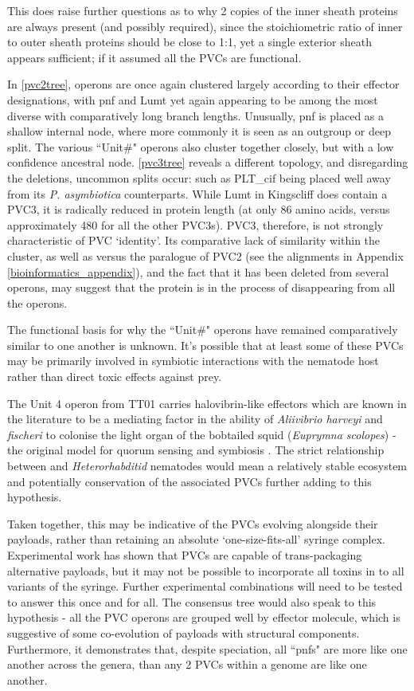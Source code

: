 This does raise further questions as to why 2 copies of the inner sheath proteins are always present (and possibly required), since the stoichiometric ratio of inner to outer sheath proteins should be close to 1:1, yet a single exterior sheath appears sufficient; if it assumed all the PVCs are functional.

In \vref{pvc2tree}, operons are once again clustered largely according to their effector designations, with pnf and Lumt yet again appearing to be among the most diverse with comparatively long branch lengths. Unusually, pnf is placed as a shallow internal node, where more commonly it is seen as an outgroup or deep split. The various ``Unit\#" operons also cluster together closely, but with a low confidence ancestral node. \vref{pvc3tree} reveals a different topology, and disregarding the deletions, uncommon splits occur: such as PLT\_cif being placed well away from its \emph{P. asymbiotica} counterparts. While Lumt in Kingscliff does contain a PVC3, it is radically reduced in protein length (at only 86 amino acids, versus approximately 480 for all the other PVC3s). PVC3, therefore, is not strongly characteristic of PVC `identity'. Its comparative lack of similarity within the cluster, as well as versus the paralogue of PVC2 (see the alignments in Appendix \vref{bioinformatics_appendix}), and the fact that it has been deleted from several operons, may suggest that the protein is in the process of disappearing from all the operons.

The functional basis for why the ``Unit\#" operons have remained comparatively similar to one another is unknown. It's possible that at least some of these PVCs may be primarily involved in symbiotic interactions with the nematode host rather than direct toxic effects against prey.

The Unit 4 operon from TT01 carries halovibrin-like effectors which are known in the literature to be a mediating factor in the ability of \emph{Aliivibrio harveyi} and \emph{fischeri} to colonise the light organ of the bobtailed squid (\emph{Euprymna scolopes}) - the original model for quorum sensing and symbiosis \citep{Ruby1999, Verma2013}. The strict relationship between \Pa{} and \emph{Heterorhabditid} nematodes would mean a relatively stable ecosystem and potentially conservation of the associated PVCs further adding to this hypothesis.

Taken together, this may be indicative of the PVCs evolving alongside their payloads, rather than retaining an absolute `one-size-fits-all' syringe complex. Experimental work has shown that PVCs are capable of trans-packaging alternative payloads, but it may not be possible to incorporate all toxins in to all variants of the syringe. Further experimental combinations will need to be tested to answer this once and for all. The consensus tree would also speak to this hypothesis - all the PVC operons are grouped well by effector molecule, which is suggestive of some co-evolution of payloads with structural components. Furthermore, it demonstrates that, despite speciation, all ``pnfs" are more like one another across the genera, than any 2 PVCs within a genome are like one another.

